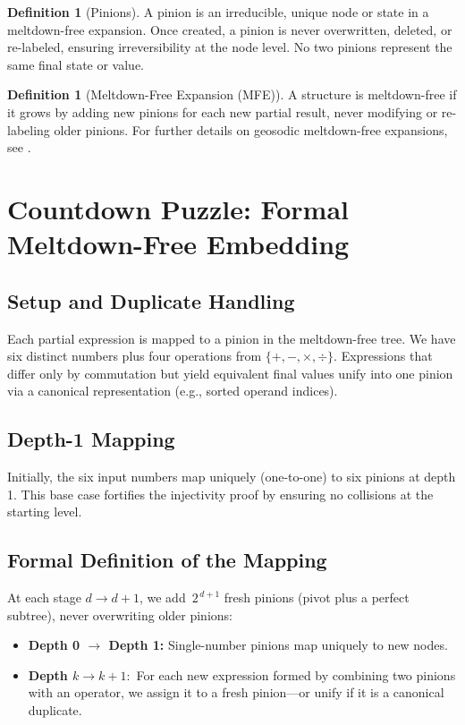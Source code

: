 \documentclass[acmsmall]{acmart}
\theoremstyle{definition}
\newtheorem{definition}[theorem]{Definition}
\theoremstyle{remark}
\begin{document}
\begin{definition}[Pinions]
A pinion is an irreducible, unique node or state in a meltdown-free expansion.
Once created, a pinion is never overwritten, deleted, or re-labeled, ensuring
irreversibility at the node level. No two pinions represent the same final
state or value.
\end{definition}

\begin{definition}[Meltdown-Free Expansion (MFE)]
A structure is meltdown-free if it grows by adding new pinions for each
new partial result, never modifying or re-labeling older pinions. For further
details on geosodic meltdown-free expansions, see \cite{geosodicPaper2025}.
\end{definition}

\section{Countdown Puzzle: Formal Meltdown-Free Embedding}
\label{sec:countdown-proof}

\subsection{Setup and Duplicate Handling}
\label{sec:countdown-setup}
Each partial expression is mapped to a pinion in the meltdown-free tree.
We have six distinct numbers plus four operations from
\(\{+, -, \times, \div\}\). Expressions that differ only by commutation but yield
equivalent final values unify into one pinion via a canonical representation
(e.g., sorted operand indices).

\subsection{Depth-1 Mapping}
Initially, the six input numbers map uniquely (one-to-one) to six pinions at
depth 1. This base case fortifies the injectivity proof by ensuring no collisions
at the starting level.

\subsection{Formal Definition of the Mapping}
At each stage \(d \to d+1\), we add \(\,2^{\,d+1}\) fresh pinions (pivot plus a
perfect subtree), never overwriting older pinions:
\begin{itemize}
  \item \textbf{Depth 0 \(\to\) Depth 1:} Single-number pinions map uniquely to new nodes.
  \item \textbf{Depth \(k \to k+1:\)} For each new expression formed by combining two pinions
        with an operator, we assign it to a fresh pinion—or unify if it is a
        canonical duplicate.
\end{itemize}
\end{document}
